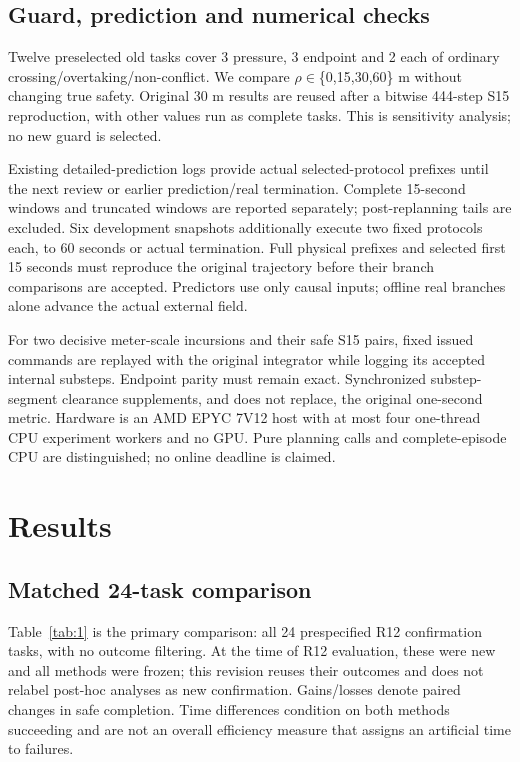 \documentclass[conference]{IEEEtran}
\begin{document}
\subsection{Guard, prediction and numerical checks}

Twelve preselected old tasks cover 3 pressure, 3 endpoint and 2 each of ordinary crossing/overtaking/non-conflict. We compare \ensuremath{\rho}\ensuremath{\in}\{0,15,30,60\} m without changing true safety. Original 30 m results are reused after a bitwise 444-step S15 reproduction, with other values run as complete tasks. This is sensitivity analysis; no new guard is selected.

Existing detailed-prediction logs provide actual selected-protocol prefixes until the next review or earlier prediction/real termination. Complete 15-second windows and truncated windows are reported separately; post-replanning tails are excluded. Six development snapshots additionally execute two fixed protocols each, to 60 seconds or actual termination. Full physical prefixes and selected first 15 seconds must reproduce the original trajectory before their branch comparisons are accepted. Predictors use only causal inputs; offline real branches alone advance the actual external field.

For two decisive meter-scale incursions and their safe S15 pairs, fixed issued commands are replayed with the original integrator while logging its accepted internal substeps. Endpoint parity must remain exact. Synchronized substep-segment clearance supplements, and does not replace, the original one-second metric. Hardware is an AMD EPYC 7V12 host with at most four one-thread CPU experiment workers and no GPU. Pure planning calls and complete-episode CPU are distinguished; no online deadline is claimed.

\section{Results}

\subsection{Matched 24-task comparison}

Table~\ref{tab:1} is the primary comparison: all 24 prespecified R12 confirmation tasks, with no outcome filtering. At the time of R12 evaluation, these were new and all methods were frozen; this revision reuses their outcomes and does not relabel post-hoc analyses as new confirmation. Gains/losses denote paired changes in safe completion. Time differences condition on both methods succeeding and are not an overall efficiency measure that assigns an artificial time to failures.
\end{document}
